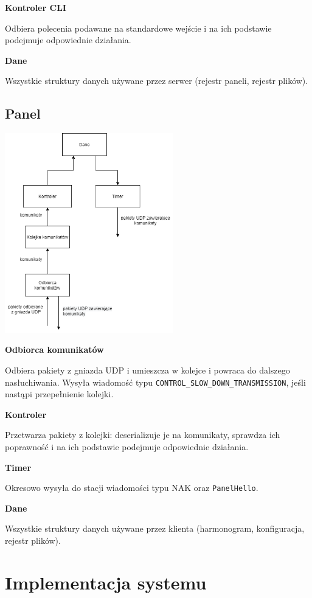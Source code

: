 \documentclass[12pt, a4paper]{article}
\begin{document}
\textbf{Kontroler CLI}

Odbiera polecenia podawane na standardowe wejście i na ich podstawie podejmuje odpowiednie działania.

\textbf{Dane}

Wszystkie struktury danych używane przez serwer (rejestr paneli, rejestr plików).

\hypertarget{panel}{%
\subsection{Panel}\label{panel}}

\begin{center}
\includegraphics[width=0.55\textwidth]{client_arch.png}
\end{center}

\textbf{Odbiorca komunikatów}

Odbiera pakiety z gniazda UDP i umieszcza w kolejce i powraca do dalszego nasłuchiwania. Wysyła wiadomość typu \texttt{CONTROL\_SLOW\_DOWN\_TRANSMISSION}, jeśli nastąpi przepełnienie kolejki.

\textbf{Kontroler}

Przetwarza pakiety z kolejki: deserializuje je na komunikaty, sprawdza ich poprawność i na ich podstawie podejmuje odpowiednie działania.

\textbf{Timer}

Okresowo wysyła do stacji wiadomości typu NAK oraz \texttt{PanelHello}.

\textbf{Dane}

Wszystkie struktury danych używane przez klienta (harmonogram, konfiguracja, rejestr plików).

\hypertarget{implementacja}{%
\section{Implementacja systemu}\label{implementacja}}
\end{document}
